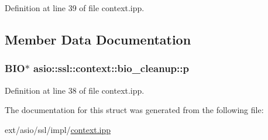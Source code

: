 Definition at line 39 of file context.\+ipp.



\subsection{Member Data Documentation}
\hypertarget{structasio_1_1ssl_1_1context_1_1bio__cleanup_a9c1333ab6aaa379787e4fe9746287657}{}
\subsubsection[{p}]{\setlength{\rightskip}{0pt plus 5cm}B\+I\+O$\ast$ asio\+::ssl\+::context\+::bio\+\_\+cleanup\+::p}\label{structasio_1_1ssl_1_1context_1_1bio__cleanup_a9c1333ab6aaa379787e4fe9746287657}


Definition at line 38 of file context.\+ipp.



The documentation for this struct was generated from the following file\+:\begin{DoxyCompactItemize}
\item 
ext/asio/ssl/impl/\hyperlink{context_8ipp}{context.\+ipp}\end{DoxyCompactItemize}
